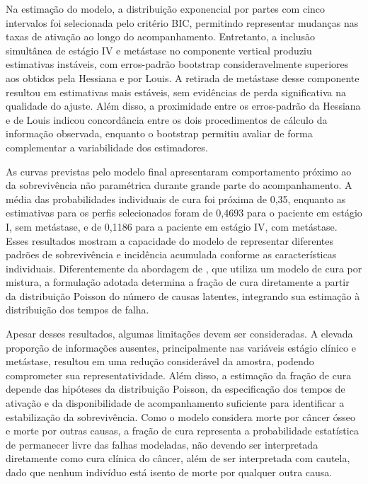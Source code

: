 \documentclass[11pt,a4paper]{article}
\begin{document}
Na estimação do modelo, a distribuição exponencial por partes com cinco intervalos foi selecionada pelo critério BIC, permitindo representar mudanças nas taxas de ativação ao longo do acompanhamento. Entretanto, a inclusão simultânea de estágio IV e metástase no componente vertical produziu estimativas instáveis, com erros-padrão bootstrap consideravelmente superiores aos obtidos pela Hessiana e por Louis. A retirada de metástase desse componente resultou em estimativas mais estáveis, sem evidências de perda significativa na qualidade do ajuste. Além disso, a proximidade entre os erros-padrão da Hessiana e de Louis indicou concordância entre os dois procedimentos de cálculo da informação observada, enquanto o bootstrap permitiu avaliar de forma complementar a variabilidade dos estimadores.

As curvas previstas pelo modelo final apresentaram comportamento próximo ao da sobrevivência não paramétrica durante grande parte do acompanhamento. A média das probabilidades individuais de cura foi próxima de 0,35, enquanto as estimativas para os perfis selecionados foram de 0,4693 para o paciente em estágio I, sem metástase, e de 0,1186 para a paciente em estágio IV, com metástase. Esses resultados mostram a capacidade do modelo de representar diferentes padrões de sobrevivência e incidência acumulada conforme as características individuais. Diferentemente da abordagem de \cite{Nicolaie2019}, que utiliza um modelo de cura por mistura, a formulação adotada determina a fração de cura diretamente a partir da distribuição Poisson do número de causas latentes, integrando sua estimação à distribuição dos tempos de falha.

Apesar desses resultados, algumas limitações devem ser consideradas. A elevada proporção de informações ausentes, principalmente nas variáveis estágio clínico e metástase, resultou em uma redução considerável da amostra, podendo comprometer sua representatividade. Além disso, a estimação da fração de cura depende das hipóteses da distribuição Poisson, da especificação dos tempos de ativação e da disponibilidade de acompanhamento suficiente para identificar a estabilização da sobrevivência. Como o modelo considera morte por câncer ósseo e morte por outras causas, a fração de cura representa a probabilidade estatística de permanecer livre das falhas modeladas, não devendo ser interpretada diretamente como cura clínica do câncer, além de ser interpretada com cautela, dado que nenhum indivíduo está isento de morte por qualquer outra causa.
\end{document}
